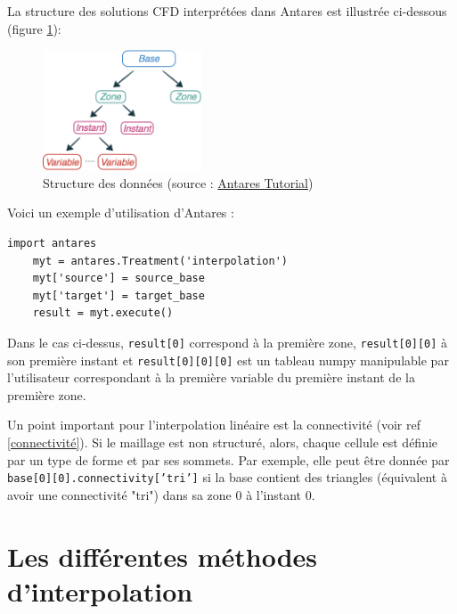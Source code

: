 
La structure des solutions CFD interprétées dans Antares est illustrée ci-dessous (figure \ref{fig:structure_antares}):

\begin{figure}[H]
\centering
\includegraphics[width=0.42\textwidth]{images/data_structure_1.png}
\caption{Structure des données (source : \href{https://cerfacs.fr/antares/src/tutorial/base.html}{Antares Tutorial})}
\label{fig:structure_antares}
\end{figure}

Voici un exemple d'utilisation d'Antares :

\begin{lstlisting}[caption=Exemple simple d'utilisation d'Antares pour interpoler, label={lst:antares_2}]
    import antares
    myt = antares.Treatment('interpolation')
    myt['source'] = source_base
    myt['target'] = target_base
    result = myt.execute()
\end{lstlisting}

Dans le cas ci-dessus, \texttt{result[0]} correspond à la première zone, \texttt{result[0][0]} à son première instant et \texttt{result[0][0][0]} est un tableau numpy manipulable par l'utilisateur correspondant à la première variable du première instant de la première zone.

Un point important pour l'interpolation linéaire est la connectivité (voir ref \ref{connectivité}). Si le maillage est non structuré, alors, chaque cellule est définie par un type de forme et par ses sommets. Par exemple, elle peut être donnée par \texttt{base[0][0].connectivity['tri']} si la base contient des triangles (équivalent à avoir une connectivité "tri") dans sa zone 0 à l'instant 0.


\newpage
\section{Les différentes méthodes d'interpolation}

